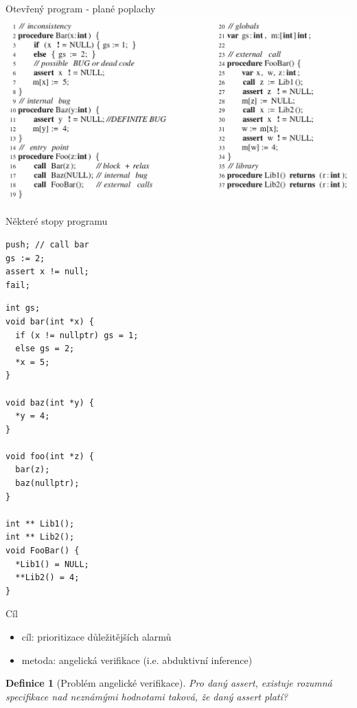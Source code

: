 \documentclass[11pt]{beamer}
\newtheorem{dfn}{Definice}
\begin{document}
\begin{frame}{Otevřený program - plané poplachy}
\includegraphics[width=1.0\linewidth]{img/exampleProgram.png}
\end{frame}

\begin{frame}[fragile]{Některé stopy programu}
\begin{lstlisting}
push; // call bar
gs := 2;
assert x != null;
fail;
\end{lstlisting}
\end{frame}

\begin{frame}[fragile]
\begin{lstlisting}
int gs;
void bar(int *x) {
  if (x != nullptr) gs = 1;
  else gs = 2;
  *x = 5;
}

void baz(int *y) {
  *y = 4;
}

void foo(int *z) {
  bar(z);
  baz(nullptr);
}

int ** Lib1();
int ** Lib2();
void FooBar() {
  *Lib1() = NULL;
  **Lib2() = 4;
}
\end{lstlisting}
\end{frame}


\begin{frame}{Cíl}
\begin{itemize}
\item cíl: prioritizace důležitějších alarmů
\item  metoda: angelická verifikace (i.e. abduktivní inference)
\end{itemize}

\begin{dfn}[Problém angelické verifikace]
Pro daný assert, existuje rozumná specifikace nad neznámými hodnotami taková,
že daný assert platí?
\end{dfn}

\end{frame}
\end{document}
